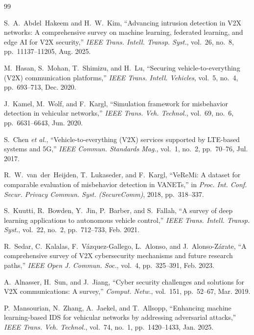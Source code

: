 \documentclass[journal]{IEEEtran}
\begin{document}
\begin{thebibliography}{99}

S.~A.~Abdel~Hakeem and H.~W.~Kim, ``Advancing intrusion detection in V2X networks: A comprehensive survey on machine learning, federated learning, and edge AI for V2X security,'' \emph{IEEE Trans. Intell. Transp. Syst.}, vol.~26, no.~8, pp.~11137--11205, Aug. 2025.

M.~Hasan, S.~Mohan, T.~Shimizu, and H.~Lu, ``Securing vehicle-to-everything (V2X) communication platforms,'' \emph{IEEE Trans. Intell. Vehicles}, vol.~5, no.~4, pp.~693--713, Dec. 2020.

J.~Kamel, M.~Wolf, and F.~Kargl, ``Simulation framework for misbehavior detection in vehicular networks,'' \emph{IEEE Trans. Veh. Technol.}, vol.~69, no.~6, pp.~6631--6643, Jun. 2020.

S.~Chen \emph{et al.}, ``Vehicle-to-everything (V2X) services supported by LTE-based systems and 5G,'' \emph{IEEE Commun. Standards Mag.}, vol.~1, no.~2, pp.~70--76, Jul. 2017.

R.~W.~van~der~Heijden, T.~Lukaseder, and F.~Kargl, ``VeReMi: A dataset for comparable evaluation of misbehavior detection in VANETs,'' in \emph{Proc. Int. Conf. Secur. Privacy Commun. Syst. (SecureComm)}, 2018, pp.~318--337.

S.~Kuutti, R.~Bowden, Y.~Jin, P.~Barber, and S.~Fallah, ``A survey of deep learning applications to autonomous vehicle control,'' \emph{IEEE Trans. Intell. Transp. Syst.}, vol.~22, no.~2, pp.~712--733, Feb. 2021.

R.~Sedar, C.~Kalalas, F.~V{\'a}zquez-Gallego, L.~Alonso, and J.~Alonso-Z{\'a}rate, ``A comprehensive survey of V2X cybersecurity mechanisms and future research paths,'' \emph{IEEE Open J. Commun. Soc.}, vol.~4, pp.~325--391, Feb. 2023.

A.~Alnasser, H.~Sun, and J.~Jiang, ``Cyber security challenges and solutions for V2X communications: A survey,'' \emph{Comput. Netw.}, vol.~151, pp.~52--67, Mar. 2019.

P.~Mansourian, N.~Zhang, A.~Jaekel, and T.~Allsopp, ``Enhancing machine learning-based IDS for vehicular networks by addressing adversarial attacks,'' \emph{IEEE Trans. Veh. Technol.}, vol.~74, no.~1, pp.~1420--1433, Jan. 2025.


\end{thebibliography}
\end{document}
